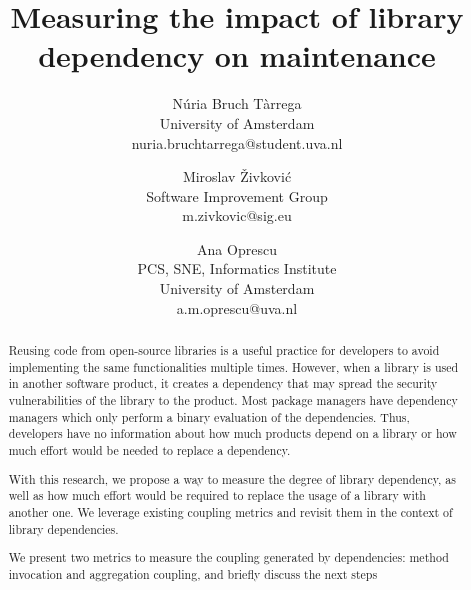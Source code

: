 \documentclass[a4paper]{article}
\title{Measuring the impact of library dependency on maintenance}
\author{
Núria Bruch Tàrrega \\ University of Amsterdam \\ nuria.bruchtarrega@student.uva.nl
\and
Miroslav \v{Z}ivkovi\'{c} \\ Software Improvement Group \\ m.zivkovic@sig.eu
\and
Ana Oprescu \\ PCS, SNE, Informatics Institute\\
                University of Amsterdam \\ a.m.oprescu@uva.nl
}
\begin{document}
\maketitle

\begin{abstract}




Reusing code from open-source libraries is a useful practice for developers to avoid implementing the same functionalities multiple times. However, when a library is used in another software product, it creates a dependency that may spread the security vulnerabilities of the library to the product. Most package managers have dependency managers which only perform a binary evaluation of the dependencies. Thus, developers have no information about how much products depend on a library or how much effort would be needed to replace a dependency.

With this research, we propose a way to measure the degree of library dependency, as well as how much effort would be required to replace the usage of a library with another one. We leverage existing coupling metrics and revisit them in the context of library dependencies.

We present two metrics to measure the coupling generated by dependencies: method invocation and aggregation coupling, and briefly discuss the next steps

\end{abstract}
\end{document}
